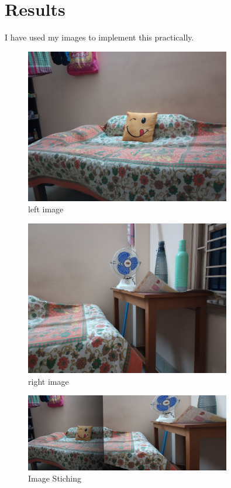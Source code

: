\documentclass[12pt]{article}
\begin{document}
\section{Results} 
I have used my images to implement this practically.
\begin{figure}[H]
    \centering
    \includegraphics[width=0.8\textwidth]{left2.jpg}
    \caption{left image}
    \label{fig:matches}
\end{figure}
\begin{figure}[H]
    \centering
    \includegraphics[width=0.8\textwidth]{right2.jpg}
    \caption{right image}
    \label{fig:matches}
\end{figure}
\begin{figure}[H]
    \centering
    \includegraphics[width=0.8\textwidth]{panorama 2.jpg}
    \caption{Image Stiching}
    \label{fig:matches}
\end{figure}
\end{document}
